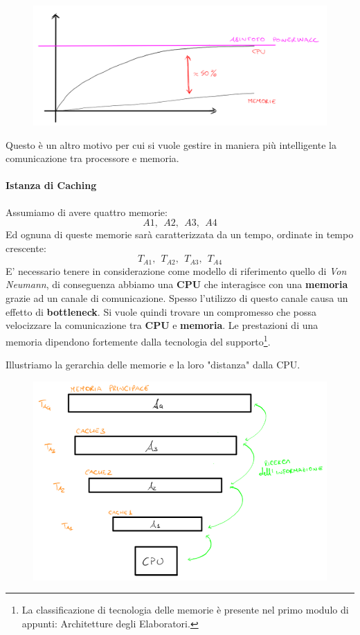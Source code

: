 \documentclass{article}
\begin{document}
\begin{figure}[htbp]
    \center
    \includegraphics[scale=0.25]{img/rapporto_CPU_mem.png}
\end{figure}

Questo è un altro motivo per cui si vuole gestire in maniera più intelligente la comunicazione tra processore e memoria.

\paragraph{Istanza di Caching} Assumiamo di avere quattro memorie:
\[ A1,\:\:A2,\:\:A3,\:\:A4 \]
Ed ognuna di queste memorie sarà caratterizzata da un tempo, ordinate in tempo crescente:
\[ T_{A1},\:\:T_{A2},\:\:T_{A3},\:\:T_{A4} \]
E' necessario tenere in considerazione come modello di riferimento quello di \textit{Von Neumann}, di conseguenza abbiamo una \textbf{CPU} che interagisce con una \textbf{memoria} grazie ad un canale di comunicazione. Spesso l'utilizzo di questo canale causa un effetto di \textbf{bottleneck}. Si vuole quindi trovare un compromesso che possa velocizzare la comunicazione tra \textbf{CPU} e \textbf{memoria}. Le prestazioni di una memoria dipendono fortemente dalla tecnologia del supporto\footnote{La classificazione di tecnologia delle memorie è presente nel primo modulo di appunti: Architetture degli Elaboratori.}.
\newpage

Illustriamo la gerarchia delle memorie e la loro "distanza" dalla CPU.

\begin{figure}[htbp]
    \center
    \includegraphics[scale=0.42]{img/gerarchiaMemorie.png}
\end{figure}
\end{document}
